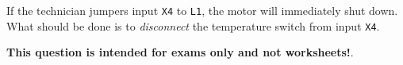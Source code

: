 





If the technician jumpers input {\tt X4} to {\tt L1}, the motor will immediately shut down.  What should be done is to {\it disconnect} the temperature switch from input {\tt X4}.









{\bf This question is intended for exams only and not worksheets!}.



